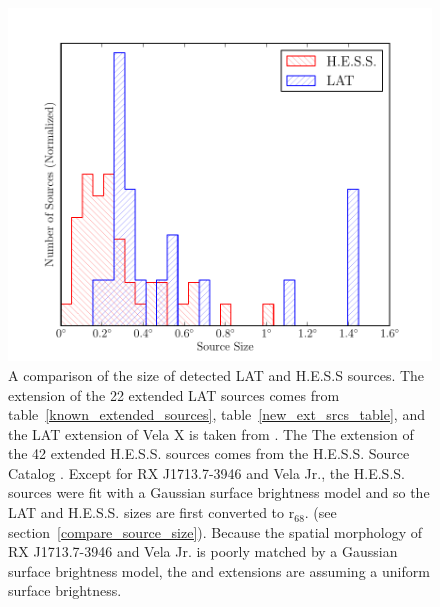 \documentclass[12pt,preprint]{aastex}
\newcommand{\gev}{\text{GeV}\xspace}
\newcommand{\tev}{\text{TeV}\xspace}
\newcommand{\rsixeight}{{\ensuremath{\text{r}_{68}}}\xspace}
\begin{document}
\clearpage
\begin{figure}
  \begin{center}
    \includegraphics{summary_plots/gev_vs_tev_histogram.pdf}
    \end{center}
    \caption{
    A comparison of the size of detected LAT and H.E.S.S sources.
    The extension of the 22 extended LAT sources comes from
    table~\ref{known_extended_sources}, table~\ref{new_ext_srcs_table},
    and the LAT extension of Vela X is taken from \citep{velax}. The
    The \tev extension of
    the 42 extended H.E.S.S. sources comes from the H.E.S.S. Source
    Catalog \citep{hesscat}.
    Except for RX J1713.7-3946 and Vela Jr.,
    the H.E.S.S. sources were fit with a Gaussian surface
    brightness model and
    so the LAT and H.E.S.S. sizes are first converted to \rsixeight.
    (see section~\ref{compare_source_size}). Because the spatial
    morphology of RX J1713.7-3946 and Vela Jr. is poorly matched by a
    Gaussian surface brightness model, the \gev and
    \tev extensions are assuming a uniform surface brightness.
    }\label{gev_vs_tev_histogram}
  \end{figure}
\end{document}
